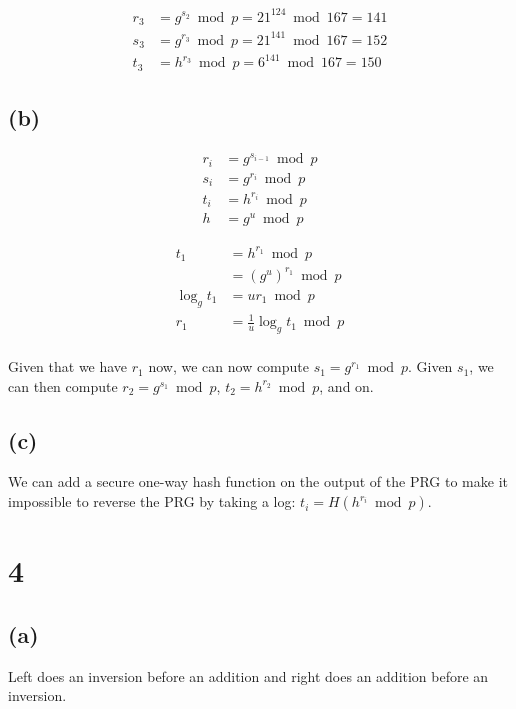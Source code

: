 \documentclass[11pt]{article}
\begin{document}
$$
\begin{align*}
r_3 &= g^{s_2} \bmod p = 21^{124} \bmod 167 = 141 \\
s_3 &= g^{r_3} \bmod p = 21^{141} \bmod 167 = 152 \\
t_3 &= h^{r_3} \bmod p = 6^{141} \bmod 167 = 150
\end{align*}
$$

\subsection{(b)}

\begin{align*}
  r_i &= g^{s_{i-1}} \bmod p \\
  s_i &= g^{r_i} \bmod p \\
  t_i &= h^{r_i} \bmod p \\
  h &= g^{u} \bmod p
\end{align*}

\begin{align*}
  t_1 &= h^{r_1} \bmod p \\
  &= (g^u)^{r_1} \bmod p \\
  \log_g t_1 &= u r_1 \bmod p \\
  r_1 &= \frac{1}{u} \log_g t_1 \bmod p \\
\end{align*}

Given that we have $r_1$ now, we can now compute $s_1 = g^{r_1} \bmod p$. Given $s_1$, we can then compute $r_2 = g^{s_1} \bmod p$, $t_2 = h^{r_2} \bmod p$, and on.

\subsection{(c)}

We can add a secure one-way hash function on the output of the PRG to make it impossible to reverse the PRG by taking a log: $t_i = H(h^{r_i} \bmod p)$.

\section{4}

\subsection{(a)}

Left does an inversion before an addition and right does an addition before an inversion.
\end{document}
